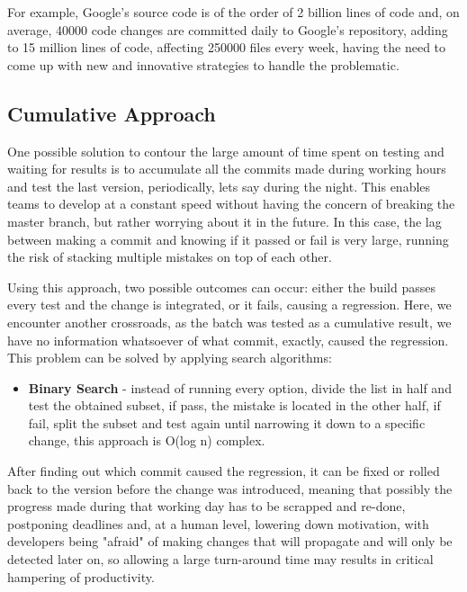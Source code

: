 For example, Google's source code is of the order of 2 billion lines of code and, on average, 40000 code changes are committed daily to Google's repository, adding to 15 million lines of code, affecting 250000 files every week, having the need to come up with new and innovative strategies to handle the problematic.\cite{Ziftci}



\subsection{Cumulative Approach}

One possible solution to contour the large amount of time spent on testing and waiting for results is to accumulate all the commits made during working hours and test the last version, periodically, lets say during the night. This enables teams to develop at a constant speed without having the concern of breaking the master branch, but rather worrying about it in the future. In this case, the lag between making a commit and knowing if it passed or fail is very large, running the risk of stacking multiple mistakes on top of each other. 

Using this approach, two possible outcomes can occur: either the build passes every test and the change is integrated, or it fails, causing a regression. Here, we encounter another crossroads, as the batch was tested as a cumulative result, we have no information whatsoever of what commit, exactly, caused the regression. This problem can be solved by applying search algorithms:

\begin{itemize}
	\item \textbf{Binary Search} - instead of running every option, divide the list in half and test the obtained subset, if pass, the mistake is located in the other half, if fail, split the subset and test again until narrowing it down to a specific change, this approach is O(log n) complex.
\end{itemize}

After finding out which commit caused the regression, it can be fixed or rolled back to the version before the change was introduced, meaning that possibly the progress made during that working day has to be scrapped and re-done, postponing deadlines and, at a human level, lowering down motivation, with developers being "afraid" of making changes that will propagate and will only be detected later on, so allowing a large turn-around time may results in critical hampering of productivity.

